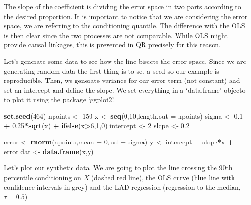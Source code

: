 \documentclass[]{book}
\newenvironment{Shaded}{\begin{snugshade}}{\end{snugshade}}
\newcommand{\KeywordTok}[1]{\textcolor[rgb]{0.13,0.29,0.53}{\textbf{#1}}}
\newcommand{\DataTypeTok}[1]{\textcolor[rgb]{0.13,0.29,0.53}{#1}}
\newcommand{\DecValTok}[1]{\textcolor[rgb]{0.00,0.00,0.81}{#1}}
\newcommand{\FloatTok}[1]{\textcolor[rgb]{0.00,0.00,0.81}{#1}}
\newcommand{\StringTok}[1]{\textcolor[rgb]{0.31,0.60,0.02}{#1}}
\newcommand{\OperatorTok}[1]{\textcolor[rgb]{0.81,0.36,0.00}{\textbf{#1}}}
\newcommand{\NormalTok}[1]{#1}
\begin{document}
The slope of the coefficient is dividing the error space in two parts
according to the desired proportion. It is important to notice that we
are considering the error space, we are referring to the conditioning
quantile. The difference with the OLS is then clear since the two
processes are not comparable. While OLS might provide causal linkages,
this is prevented in QR precisely for this reason.

Let's generate some data to see how the line bisects the error space.
Since we are generating random data the first thing is to set a seed so
our example is reproducible. Then, we generate variance for our error
term (not constant) and set an intercept and define the slope. We set
everything in a `data.frame' objecto to plot it using the package
`ggplot2'\citep{R-ggplot2}.

\begin{Shaded}
\begin{Highlighting}[]
\KeywordTok{set.seed}\NormalTok{(}\DecValTok{464}\NormalTok{)}
\NormalTok{npoints <-}\StringTok{ }\DecValTok{150}
\NormalTok{x <-}\StringTok{ }\KeywordTok{seq}\NormalTok{(}\DecValTok{0}\NormalTok{,}\DecValTok{10}\NormalTok{,}\DataTypeTok{length.out =}\NormalTok{ npoints)        }
\NormalTok{sigma <-}\StringTok{ }\FloatTok{0.1} \OperatorTok{+}\StringTok{ }\FloatTok{0.25}\OperatorTok{*}\KeywordTok{sqrt}\NormalTok{(x) }\OperatorTok{+}\StringTok{ }\KeywordTok{ifelse}\NormalTok{(x}\OperatorTok{>}\DecValTok{6}\NormalTok{,}\DecValTok{1}\NormalTok{,}\DecValTok{0}\NormalTok{)                    }
\NormalTok{intercept <-}\StringTok{ }\DecValTok{2}                                
\NormalTok{slope <-}\StringTok{ }\FloatTok{0.2}                              
                             
\NormalTok{error <-}\StringTok{ }\KeywordTok{rnorm}\NormalTok{(npoints,}\DataTypeTok{mean =} \DecValTok{0}\NormalTok{, }\DataTypeTok{sd =}\NormalTok{ sigma)      }
\NormalTok{y <-}\StringTok{ }\NormalTok{intercept }\OperatorTok{+}\StringTok{ }\NormalTok{slope}\OperatorTok{*}\NormalTok{x }\OperatorTok{+}\StringTok{ }\NormalTok{error                    }
\NormalTok{dat <-}\StringTok{ }\KeywordTok{data.frame}\NormalTok{(x,y)}
\end{Highlighting}
\end{Shaded}

Let's plot our synthetic data. We are going to plot the line crossing
the 90th percentile conditioning on \(X\) (dashed red line), the OLS
curve (blue line with confidence intervals in grey) and the LAD
regression (regression to the median, \(\tau = 0.5\))
\end{document}
